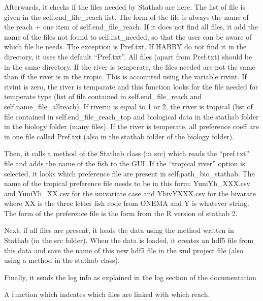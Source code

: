 \documentclass[letterpaper,10pt,english]{sphinxmanual}
\begin{document}
\begin{fulllineitems}
\begin{fulllineitems}
Afterwards, it checks if the files needed by Stathab are here. The list of file is given in the
self.end\_file\_reach list. The form of the file is always the name of the reach + one item of
self.end\_file\_reach. If it does not find all files, it add the name of the files not found to self.list\_needed,
so that the user can be aware of which file he needs. The exception is Pref.txt. If HABBY do not find it in the
directory, it uses the default “Pref.txt”. All files (apart from Pref.txt) should be in the same directory.
If the river is temperate, the files needed are not the same than if the river is in the tropic. This is
accounted using the variable rivint. If rivint is zero, the river is temparate and this function looks for the
file needed for temperate type (list of file contained in self.end\_file\_reach and self.name\_file\_allreach).
If riverin is equal to 1 or 2, the river is tropical (list of file contained in self.end\_file\_reach\_top and
biological data in the stathab folder in the biology folder (many files). If the river is temperate,
all preference coeff are in one file called Pref.txt (also in the stathab folder of the biology folder).

Then, it calls a method of the Stathab class (in src) which reads the “pref.txt” file and adds the name
of the fish to the GUI. If the ``tropical river'' option is selected, it looks which preference file are present
in self.path\_bio\_stathab. The name of the tropical preference file needs to be in this form: YuniYh\_XXX.csv and
YuniYh\_XX.csv for the univariate case and YbivYXXX.csv for the bivarate where XX is the three letter fish code
from ONEMA and Y is whatever string. The form of the preference file is the form from the R version of
stathab 2.

Next, if all files are present, it loads the data using the method written in Stathab
(in the src folder). When the data is loaded, it creates an hdf5 file from this data and save the name of this
new hdf5 file in the xml project file (also using a method in the stathab class).

Finally, it sends the log info as explained in the log section of the documentation

\end{fulllineitems}


\begin{fulllineitems}
\label{\detokenize{index:src_GUI.stathab_GUI.StathabW.reach_selected}}
A function which indcates which files are linked with which reach.


\end{fulllineitems}
\end{fulllineitems}
\end{document}
